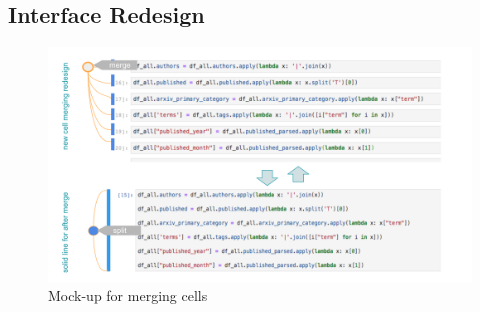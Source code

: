 \documentclass[12pt,letterpaper]{article}
\begin{document}

\subsection*{Interface Redesign}

\begin{figure}[h]
\centering
\includegraphics[scale=.6]{figures/project-principles/cell_merge.png}
\caption{Mock-up for merging cells}
\label{fig::3}
\end{figure}
\end{document}
